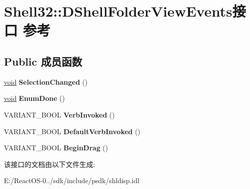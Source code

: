 \hypertarget{interface_shell32_1_1_d_shell_folder_view_events}{}\section{Shell32\+:\+:D\+Shell\+Folder\+View\+Events接口 参考}
\label{interface_shell32_1_1_d_shell_folder_view_events}
\subsection*{Public 成员函数}
\begin{DoxyCompactItemize}
\item 
\mbox{\label{interface_shell32_1_1_d_shell_folder_view_events_a2a8bcdd99bb0dd692d6448abc29316de}} 
\hyperlink{interfacevoid}{void} {\bfseries Selection\+Changed} ()
\item 
\mbox{\label{interface_shell32_1_1_d_shell_folder_view_events_abccbab6032b5c18ece1338cd1ec79492}} 
\hyperlink{interfacevoid}{void} {\bfseries Enum\+Done} ()
\item 
\mbox{\label{interface_shell32_1_1_d_shell_folder_view_events_a6456c427f7562c1f761795382b29a14d}} 
V\+A\+R\+I\+A\+N\+T\+\_\+\+B\+O\+OL {\bfseries Verb\+Invoked} ()
\item 
\mbox{\label{interface_shell32_1_1_d_shell_folder_view_events_af7450312b921aa235dbd3769386f0348}} 
V\+A\+R\+I\+A\+N\+T\+\_\+\+B\+O\+OL {\bfseries Default\+Verb\+Invoked} ()
\item 
\mbox{\label{interface_shell32_1_1_d_shell_folder_view_events_a4bae2bb908601ed19f0fb3ccace30553}} 
V\+A\+R\+I\+A\+N\+T\+\_\+\+B\+O\+OL {\bfseries Begin\+Drag} ()
\end{DoxyCompactItemize}


该接口的文档由以下文件生成\+:\begin{DoxyCompactItemize}
\item 
E\+:/\+React\+O\+S-\/0../sdk/include/psdk/shldisp.\+idl\end{DoxyCompactItemize}

